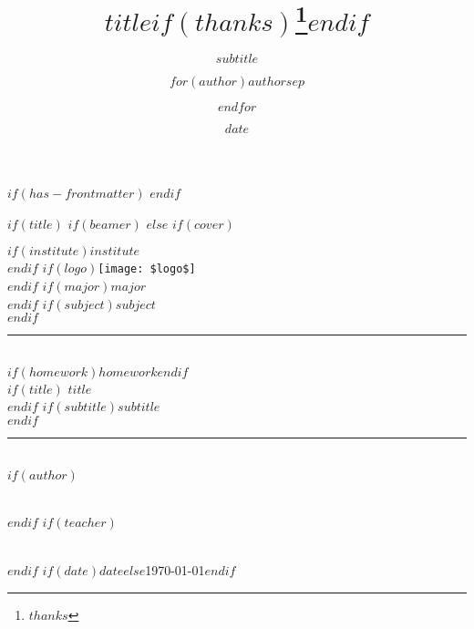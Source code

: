 \documentclass[
    $if(fontsize)$
      $fontsize$,
    $endif$
    $if(lang)$
      $babel-lang$,
    $endif$
    $if(papersize)$
      $papersize$paper,
    $endif$
    $if(beamer)$
        ignorenonframetext,
        $if(handout)$
          handout,
        $endif$
        $if(aspectratio)$
          aspectratio=$aspectratio$,
        $endif$
    $endif$
    $for(classoption)$
      $classoption$$sep$,
    $endfor$
]{$documentclass$}
\title{$title$$if(thanks)$\thanks{$thanks$}$endif$}
\subtitle{$subtitle$}
\author{$for(author)$$author$$sep$ \and $endfor$}
\date{$date$}
\institute{$for(institute)$$institute$$sep$ \and $endfor$}
\begin{document}
$if(has-frontmatter)$
\frontmatter
$endif$

$if(title)$
    $if(beamer)$
        \frame{\titlepage}
    $else$
        $if(cover)$
            \begin{titlepage}
            \newcommand{\HRule}{\rule{\linewidth}{0.5mm}}
            \center
            $if(institute)$\textsc{\LARGE $institute$}\\[0.5cm]$endif$
            $if(logo)$\texttt{[image: \$logo\$]}\\[1cm]$endif$
            $if(major)$\textsc{\Large $major$}\\$endif$
            $if(subject)$\textsc{\large $subject$}\\[0.5cm]$endif$
            \HRule \\[0.4cm]
            $if(homework)$$homework$$endif$\\[0.2cm]
            $if(title)${ \huge \bfseries $title$}\\[0.2cm]$endif$
            $if(subtitle)${\large $subtitle$}\\[0.4cm]$endif$
            \HRule \\[1cm]
            $if(author)$
                \begin{minipage}{0.4\textwidth}
                \end{minipage}\\[1cm]
            $endif$
            $if(teacher)$
                \begin{minipage}{0.4\textwidth}
                \end{minipage}\\[1cm]
            $endif$
            {\large $if(date)$$date$$else$\today$endif$}
            \vfill
            \end{titlepage}
\end{document}
